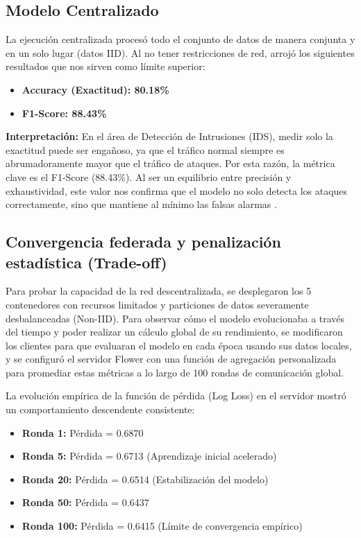 \documentclass[12pt,a4paper]{article}
\begin{document}
\subsection{Modelo Centralizado}
La ejecución centralizada procesó todo el conjunto de datos de manera conjunta y en un solo lugar (datos IID). Al no tener restricciones de red, arrojó los siguientes resultados que nos sirven como límite superior:
\begin{itemize}
    \item \textbf{Accuracy (Exactitud): 80.18\%}
    \item \textbf{F1-Score: 88.43\%}
\end{itemize}

\textbf{Interpretación:} En el área de Detección de Intrusiones (IDS), medir solo la exactitud puede ser engañoso, ya que el tráfico normal siempre es abrumadoramente mayor que el tráfico de ataques. Por esta razón, la métrica clave es el F1-Score (88.43\%). Al ser un equilibrio entre precisión y exhaustividad, este valor nos confirma que el modelo no solo detecta los ataques correctamente, sino que mantiene al mínimo las falsas alarmas \cite{zhao2018}.

\subsection{Convergencia federada y penalización estadística (Trade-off)}
Para probar la capacidad de la red descentralizada, se desplegaron los 5 contenedores con recursos limitados y particiones de datos severamente desbalanceadas (Non-IID). Para observar cómo el modelo evolucionaba a través del tiempo y poder realizar un cálculo global de su rendimiento, se modificaron los clientes para que evaluaran el modelo en cada época usando sus datos locales, y se configuró el servidor Flower con una función de agregación personalizada para promediar estas métricas a lo largo de 100 rondas de comunicación global.

La evolución empírica de la función de pérdida (Log Loss) en el servidor mostró un comportamiento descendente consistente:
\begin{itemize}
    \item \textbf{Ronda 1:} Pérdida = 0.6870
    \item \textbf{Ronda 5:} Pérdida = 0.6713 (Aprendizaje inicial acelerado)
    \item \textbf{Ronda 20:} Pérdida = 0.6514 (Estabilización del modelo)
    \item \textbf{Ronda 50:} Pérdida = 0.6437
    \item \textbf{Ronda 100:} Pérdida = 0.6415 (Límite de convergencia empírico)
\end{itemize}
\end{document}
